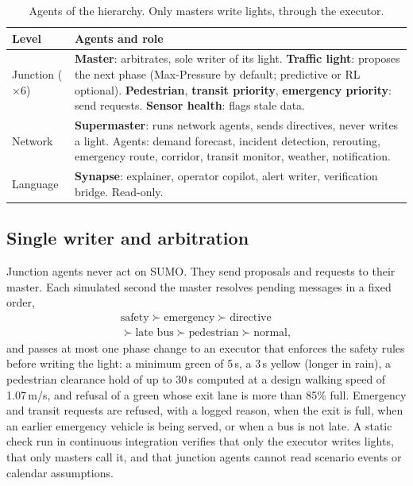 \documentclass[conference]{IEEEtran}
\begin{document}
\begin{table}[t]
\caption{Agents of the hierarchy. Only masters write lights, through the executor.}
\label{tab:hierarchy}
\centering
\footnotesize
\begin{tabular}{@{}p{1.6cm}p{6.4cm}@{}}
\toprule
Level & Agents and role \\
\midrule
Junction ($\times6$) & \textbf{Master}: arbitrates, sole writer of its light. \textbf{Traffic light}: proposes the next phase (Max-Pressure by default; predictive or RL optional). \textbf{Pedestrian}, \textbf{transit priority}, \textbf{emergency priority}: send requests. \textbf{Sensor health}: flags stale data. \\
Network & \textbf{Supermaster}: runs network agents, sends directives, never writes a light. Agents: demand forecast, incident detection, rerouting, emergency route, corridor, transit monitor, weather, notification. \\
Language & \textbf{Synapse}: explainer, operator copilot, alert writer, verification bridge. Read-only. \\
\bottomrule
\end{tabular}
\end{table}

\subsection{Single writer and arbitration}
Junction agents never act on SUMO. They send proposals and requests to their master. Each
simulated second the master resolves pending messages in a fixed order,
\begin{multline}
\text{safety} \succ \text{emergency} \succ \text{directive} \\
\succ \text{late bus} \succ \text{pedestrian} \succ \text{normal},
\end{multline}
and passes at most one phase change to an executor that enforces the safety rules before
writing the light: a minimum green of 5\,s, a 3\,s yellow (longer in rain), a pedestrian
clearance hold of up to 30\,s computed at a design walking speed of 1.07\,m/s, and refusal
of a green whose exit lane is more than 85\% full. Emergency and transit requests are
refused, with a logged reason, when the exit is full, when an earlier emergency vehicle is
being served, or when a bus is not late. A static check run in continuous integration
verifies that only the executor writes lights, that only masters call it, and that
junction agents cannot read scenario events or calendar assumptions.
\end{document}
